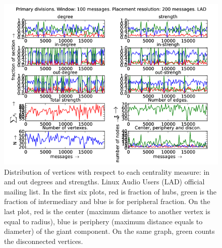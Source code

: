 \documentclass[%
 aip,
 jmp,%
 amsmath,amssymb,
 reprint,%
]{revtex4-1}
\begin{document}
\begin{figure}[hbtp] 
   \centering
        \includegraphics[width=\textwidth]{figs/LAD/100}
    \caption{Distribution of vertices with respect to each centrality measure: in and out degrees and strengths. Linux Audio Users (LAD) official mailing list. In the first six plots, red is fraction of hubs, green is the fraction of intermediary and blue is for peripheral fraction. On the last plot, red is the center (maximum distance to another vertex is equal to radius), blue is periphery (maximum distance equals to diameter) of the giant component. On the same graph, green counts the disconnected vertices.}
    \label{fig:lad100}
\end{figure}
\end{document}
